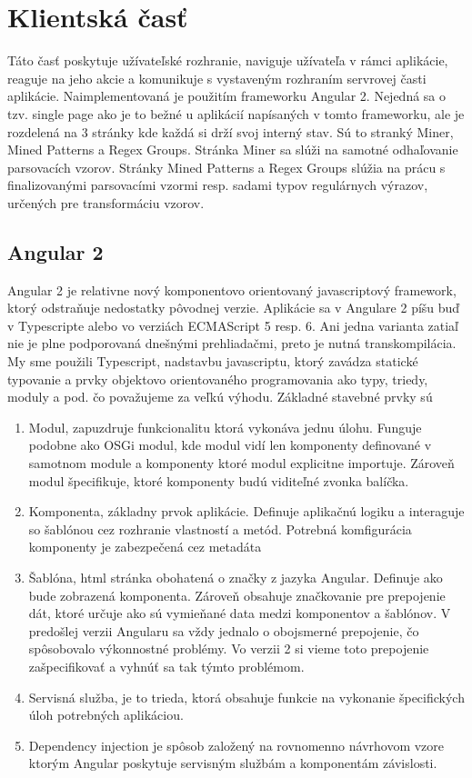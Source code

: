 \chapter{Klientská časť}
Táto časť poskytuje užívateľské rozhranie, naviguje užívateľa v rámci aplikácie, reaguje na jeho akcie a komunikuje s vystaveným rozhraním servrovej časti aplikácie. Naimplementovaná je použitím frameworku Angular 2. Nejedná sa o tzv. single page ako je to bežné u aplikácií napísaných v tomto frameworku, ale je rozdelená na 3 stránky kde každá si drží svoj interný stav. Sú to stranký Miner, Mined Patterns a Regex Groups. Stránka Miner sa slúži na samotné odhaľovanie parsovacích vzorov. Stránky Mined Patterns a Regex Groups slúžia na prácu s finalizovanými parsovacími vzormi resp. sadami typov regulárnych výrazov, určených pre transformáciu vzorov.


\section{Angular 2}
Angular 2 je relativne nový komponentovo orientovaný javascriptový framework, ktorý odstraňuje nedostatky pôvodnej verzie. Aplikácie sa v Angulare 2 píšu buď v Typescripte alebo vo verziách ECMAScript 5 resp. 6. Ani jedna varianta zatiaľ nie je plne podporovaná dnešnými prehliadačmi, preto je nutná transkompilácia. My sme použili Typescript, nadstavbu javascriptu, ktorý zavádza statické typovanie a prvky objektovo orientovaného programovania ako typy, triedy, moduly a pod. čo považujeme za veľkú výhodu. Základné stavebné prvky sú

\begin{enumerate}
 \item Modul, zapuzdruje funkcionalitu ktorá vykonáva jednu úlohu. Funguje podobne ako OSGi modul, kde modul vidí len komponenty definované v samotnom module a komponenty ktoré modul explicitne importuje. Zároveň modul špecifikuje, ktoré komponenty budú viditeľné zvonka balíčka.
 \item Komponenta, základny prvok aplikácie. Definuje aplikačnú logiku a interaguje so šablónou cez rozhranie vlastností a metód. Potrebná komfigurácia komponenty je zabezpečená cez metadáta
 \item Šablóna, html stránka obohatená o značky z jazyka Angular. Definuje ako bude zobrazená komponenta. Zároveň obsahuje značkovanie pre prepojenie dát, ktoré určuje ako sú vymieňané data medzi komponentov a šablónov. V predošlej verzii Angularu sa vždy jednalo o obojsmerné prepojenie, čo spôsobovalo výkonnostné problémy. Vo verzii 2 si vieme toto prepojenie zašpecifikovať a vyhnúť sa tak týmto problémom.
 \item Servisná služba, je to trieda, ktorá obsahuje funkcie na vykonanie špecifických úloh potrebných aplikáciou. 
 \item Dependency injection je spôsob založený na rovnomenno návrhovom vzore ktorým Angular poskytuje servisným službám a komponentám závislosti.
\end{enumerate}

